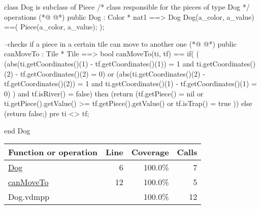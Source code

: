 \begin{vdmpp}[breaklines=true]
class Dog is subclass of Piece
/*
class responsible for the pieces of type Dog
*/
operations
(*@
\label{Dog:6}
@*)
 public Dog : Color * nat1 ==> Dog
   Dog(a_color, a_value) ==(
    Piece(a_color, a_value);
   );
   
--checks if a piece in a certain tile can move to another one
(*@
\label{canMoveTo:12}
@*)
 public canMoveTo : Tile * Tile  ==> bool
 canMoveTo(ti, tf) 
  ==  if(
       (
       (abs(ti.getCoordinates()(1) - tf.getCoordinates()(1)) = 1 and ti.getCoordinates()(2) - tf.getCoordinates()(2) = 0) or 
       (abs(ti.getCoordinates()(2) - tf.getCoordinates()(2)) = 1 and ti.getCoordinates()(1) - tf.getCoordinates()(1) = 0)
       ) 
      and tf.isRiver() = false)
       then (return (tf.getPiece() = nil or ti.getPiece().getValue() >= tf.getPiece().getValue() or tf.isTrap() = true )) 
    else (return false;)
 pre ti <> tf;

end Dog
\end{vdmpp}
\bigskip
\begin{longtable}{|l|r|r|r|}
\hline
Function or operation & Line & Coverage & Calls \\
\hline
\hline
\hyperref[Dog:6]{Dog} & 6&100.0\% & 7 \\
\hline
\hyperref[canMoveTo:12]{canMoveTo} & 12&100.0\% & 5 \\
\hline
\hline
Dog.vdmpp & & 100.0\% & 12 \\
\hline
\end{longtable}

